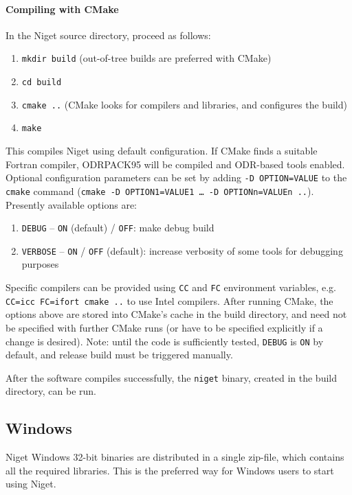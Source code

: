 \paragraph{Compiling with CMake}

In the Niget source directory, proceed as follows:

\begin{enumerate}
\item \texttt{mkdir build} (out-of-tree builds are preferred with CMake)
\item \texttt{cd build}
\item \texttt{cmake ..} (CMake looks for compilers and libraries, and configures the build)
\item \texttt{make}
\end{enumerate}

This compiles Niget using default configuration. If CMake finds a suitable Fortran compiler, ODRPACK95 will be compiled and ODR-based tools enabled. Optional configuration parameters can be set by adding \texttt{-D OPTION=VALUE} to the \texttt{cmake} command (\texttt{cmake -D OPTION1=VALUE1 \dots\ -D OPTIONn=VALUEn ..}). Presently available options are:

\begin{enumerate}
\item \texttt{DEBUG} -- \texttt{ON} (default) / \texttt{OFF}: make debug build
\item \texttt{VERBOSE} -- \texttt{ON} / \texttt{OFF} (default): increase verbosity of some tools for debugging purposes
\end{enumerate}

Specific compilers can be provided using \texttt{CC} and \texttt{FC} environment variables, e.g. \texttt{CC=icc FC=ifort cmake ..} to use Intel compilers. After running CMake, the options above are stored into CMake's cache in the build directory, and need not be specified with further CMake runs (or have to be specified explicitly if a change is desired). Note: until the code is sufficiently tested, \texttt{DEBUG} is \texttt{ON} by default, and release build must be triggered manually.

After the software compiles successfully, the \texttt{niget} binary, created in the build directory, can be run.


\subsection{Windows}

Niget Windows 32-bit binaries are distributed in a single zip-file, which contains all the required libraries.
This is the preferred way for Windows users to start using Niget.

